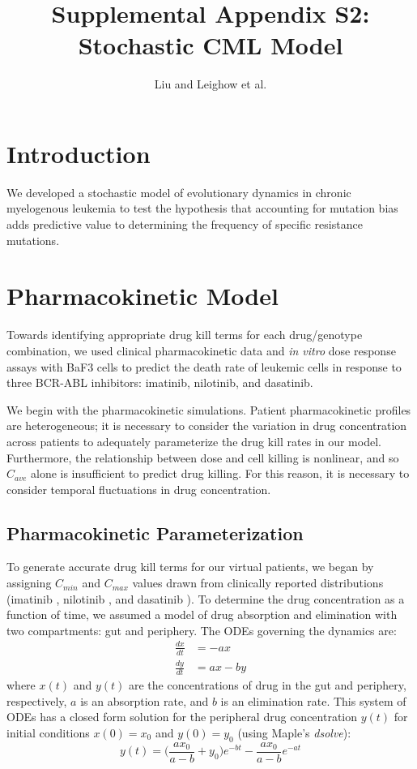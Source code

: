 \documentclass{article}
\title{Supplemental Appendix S2: \\
\large Stochastic CML Model}
\author{Liu and Leighow et al.}
\begin{document}
\maketitle

\section{Introduction}

We developed a stochastic model of evolutionary dynamics in chronic myelogenous leukemia to test the hypothesis that accounting for mutation bias adds predictive value to determining the frequency of specific resistance mutations.

\section{Pharmacokinetic Model}

Towards identifying appropriate drug kill terms for each drug/genotype combination, we used clinical pharmacokinetic data and \textit{in vitro} dose response assays with BaF3 cells to predict the death rate of leukemic cells in response to three BCR-ABL inhibitors: imatinib, nilotinib, and dasatinib.  

We begin with the pharmacokinetic simulations.  Patient pharmacokinetic profiles are heterogeneous; it is necessary to consider the variation in drug concentration across patients to adequately parameterize the drug kill rates in our model.  Furthermore, the relationship between dose and cell killing is nonlinear, and so $C_{ave}$ alone is insufficient to predict drug killing.  For this reason, it is necessary to consider temporal fluctuations in drug concentration.
\subsection{Pharmacokinetic Parameterization}
To generate accurate drug kill terms for our virtual patients, we began by assigning $C_{min}$ and $C_{max}$ values drawn from clinically reported distributions (imatinib \cite{1}, nilotinib \cite{2}, and dasatinib \cite{3}).  To determine the drug concentration as a function of time, we assumed a model of drug absorption and elimination with two compartments: gut and periphery.  The ODEs governing the dynamics are:
\begin{equation}
\begin{split}
\frac{dx}{dt} &= -a x \\
\frac{dy}{dt} &= a x - b y
\end{split}
\end{equation}
where $x(t)$ and $y(t)$ are the concentrations of drug in the gut and periphery, respectively, $a$ is an absorption rate, and $b$ is an elimination rate.  This system of ODEs has a closed form solution for the peripheral drug concentration $y(t)$ for initial conditions $x(0) = x_0$ and $y(0) = y_0$ (using Maple's \textit{dsolve}):
\begin{equation}
y(t) = \Big(\frac{a x_0}{a-b} + y_0\Big) e^{-b t} - \frac{a x_0}{a - b} e^{-a t}
\end{equation}
\end{document}
